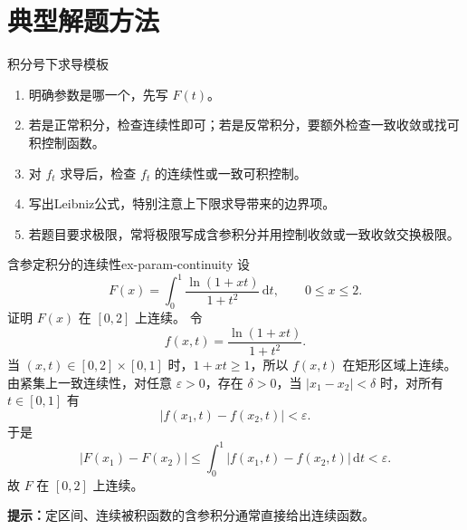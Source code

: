 \documentclass[UTF8,zihao=-4,openany]{ctexbook}
\begin{document}
\section{典型解题方法}
\begin{methodbox}{积分号下求导模板}
\begin{enumerate}
\item 明确参数是哪一个，先写 $F(t)$。
\item 若是正常积分，检查连续性即可；若是反常积分，要额外检查一致收敛或找可积控制函数。
\item 对 $f_t$ 求导后，检查 $f_t$ 的连续性或一致可积控制。
\item 写出Leibniz公式，特别注意上下限求导带来的边界项。
\item 若题目要求极限，常将极限写成含参积分并用控制收敛或一致收敛交换极限。
\end{enumerate}
\end{methodbox}

\begin{example}{含参定积分的连续性}{ex-param-continuity}
设
\[
  F(x)=\int_0^1 \frac{\ln(1+xt)}{1+t^2}\,\mathrm{d}t,\qquad 0\leq x\leq 2.
\]
证明 $F(x)$ 在 $[0,2]$ 上连续。
\tcblower
令
\[
  f(x,t)=\frac{\ln(1+xt)}{1+t^2}.
\]
当 $(x,t)\in[0,2]\times[0,1]$ 时，$1+xt\geq1$，所以 $f(x,t)$ 在矩形区域上连续。由紧集上一致连续性，对任意 $\varepsilon>0$，存在 $\delta>0$，当 $|x_1-x_2|<\delta$ 时，对所有 $t\in[0,1]$ 有
\[
  |f(x_1,t)-f(x_2,t)|<\varepsilon.
\]
于是
\[
  |F(x_1)-F(x_2)|
  \leq \int_0^1 |f(x_1,t)-f(x_2,t)|\,\mathrm{d}t
  <\varepsilon.
\]
故 $F$ 在 $[0,2]$ 上连续。

\textbf{提示：}定区间、连续被积函数的含参积分通常直接给出连续函数。
\end{example}
\end{document}
